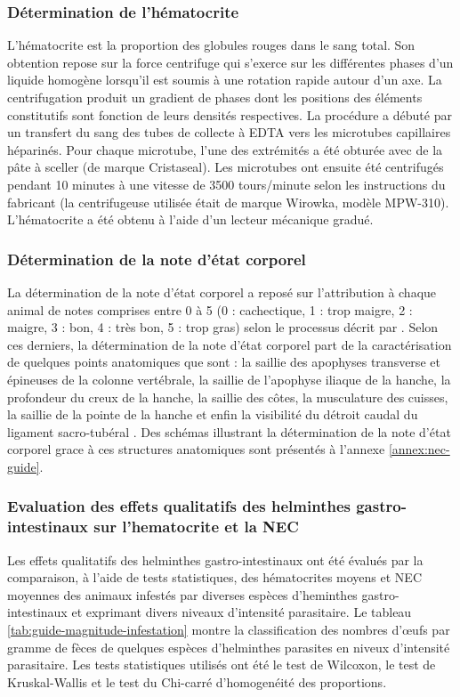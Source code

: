 \subsubsection{Détermination de l'hématocrite}
L'hématocrite est la proportion des globules rouges dans le sang total. Son obtention 
repose sur la force centrifuge qui s'exerce sur les différentes phases d'un liquide homogène 
lorsqu'il est soumis à une rotation rapide autour d'un axe. La centrifugation produit un 
gradient de phases dont les positions des éléments constitutifs sont fonction de leurs 
densités respectives.  La procédure a débuté par un transfert du sang des tubes de collecte 
à EDTA vers les microtubes capillaires héparinés. Pour chaque microtube, l'une des extrémités 
a été obturée avec de la pâte à sceller (de marque Cristaseal\textsuperscript{\circledR}). 
Les microtubes ont ensuite été centrifugés pendant 10 minutes à une vitesse de 3500 
tours/minute selon les instructions du fabricant (la centrifugeuse utilisée était de 
marque Wirowka\textsuperscript{\circledR}, modèle MPW-310). L'hématocrite a été obtenu 
à l'aide d'un lecteur mécanique gradué.

\subsubsection{Détermination de la note d'état corporel}
La détermination de la note d'état corporel a reposé sur l'attribution à chaque animal de notes 
comprises entre 0 à 5 (0 : cachectique, 1 : trop maigre, 2 : maigre, 3 : bon, 4 : très bon, 5 : 
trop gras) selon le processus décrit par . Selon ces derniers, la détermination de la note d'état corporel part de la caractérisation de quelques points anatomiques que sont : la saillie des apophyses transverse et épineuses de la colonne vertébrale, la saillie de l'apophyse iliaque de la hanche, la profondeur du creux de la hanche, la saillie des côtes, la musculature des cuisses, la saillie de la pointe de la hanche et enfin la visibilité du détroit caudal du ligament sacro-tubéral . Des schémas illustrant la détermination de la note d'état corporel grace à ces structures anatomiques sont présentés à l'annexe \ref{annex:nec-guide}.

\subsubsection{Evaluation des effets qualitatifs des helminthes gastro-intestinaux sur l'hematocrite et la NEC}
Les effets qualitatifs des helminthes gastro-intestinaux ont été évalués par la comparaison, à
l'aide de tests statistiques, des hématocrites moyens et NEC moyennes des animaux infestés par 
diverses espèces d'heminthes gastro-intestinaux et exprimant divers niveaux d'intensité 
parasitaire. Le tableau \ref{tab:guide-magnitude-infestation} montre la classification des 
nombres d'\oe ufs par gramme de fèces de quelques espèces d'helminthes parasites en niveux 
d'intensité parasitaire. Les tests statistiques utilisés ont été le test de Wilcoxon, le test 
de Kruskal-Wallis et le test du Chi-carré d'homogenéité des proportions.

